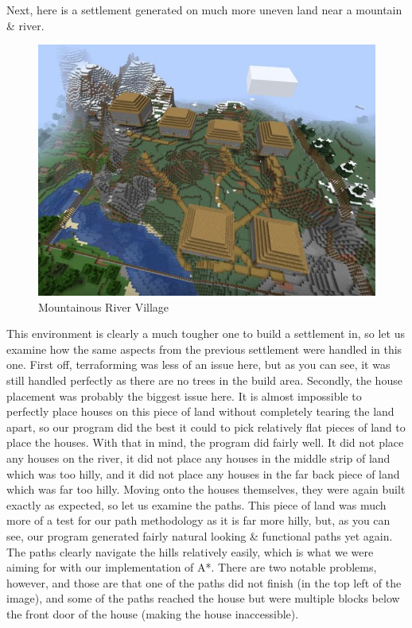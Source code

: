 \documentclass[11pt, oneside]{article}
\begin{document}
\begin{normalsize}
Next, here is a settlement generated on much more uneven land near a mountain \& river. 
\begin{figure}[H]
    \centering
    \includegraphics[width=0.75\linewidth]{village2}
    \caption{Mountainous River Village}
    \label{fig:env}
\end{figure}

This environment is clearly a much tougher one to build a settlement in, so let us examine how the same aspects from the previous settlement were handled in this one. 
First off, terraforming was less of an issue here, but as you can see, it was still handled perfectly as there are no trees in the build area. 
Secondly, the house placement was probably the biggest issue here. 
It is almost impossible to perfectly place houses on this piece of land without completely tearing the land apart, so our program did the best it could to pick relatively flat pieces of land to place the houses. 
With that in mind, the program did fairly well. 
It did not place any houses on the river, it did not place any houses in the middle strip of land which was too hilly, and it did not place any houses in the far back piece of land which was far too hilly. 
Moving onto the houses themselves, they were again built exactly as expected, so let us examine the paths. 
This piece of land was much more of a test for our path methodology as it is far more hilly, but, as you can see, our program generated fairly natural looking \& functional paths yet again. 
The paths clearly navigate the hills relatively easily, which is what we were aiming for with our implementation of A*. 
There are two notable problems, however, and those are that one of the paths did not finish (in the top left of the image), and some of the paths reached the house but were multiple blocks below the front door of the house (making the house inaccessible). 


\end{normalsize}
\end{document}
